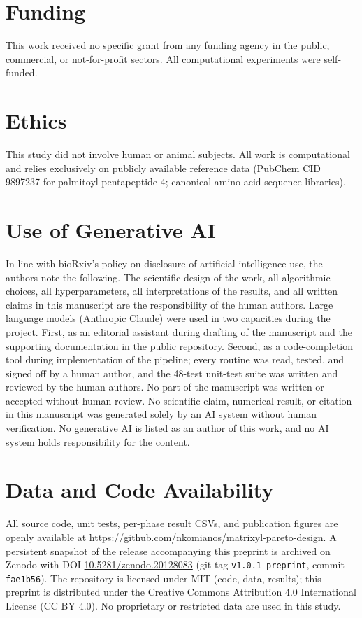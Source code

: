 \documentclass[11pt,letterpaper]{article}
\begin{document}
\section*{Funding}

This work received no specific grant from any funding agency in the public, commercial, or not-for-profit sectors. All computational experiments were self-funded.

\section*{Ethics}

This study did not involve human or animal subjects. All work is computational and relies exclusively on publicly available reference data (PubChem CID 9897237 for palmitoyl pentapeptide-4; canonical amino-acid sequence libraries).

\section*{Use of Generative AI}

In line with bioRxiv's policy on disclosure of artificial intelligence use, the authors note the following. The scientific design of the work, all algorithmic choices, all hyperparameters, all interpretations of the results, and all written claims in this manuscript are the responsibility of the human authors. Large language models (Anthropic Claude) were used in two capacities during the project. First, as an editorial assistant during drafting of the manuscript and the supporting documentation in the public repository. Second, as a code-completion tool during implementation of the pipeline; every routine was read, tested, and signed off by a human author, and the 48-test unit-test suite was written and reviewed by the human authors. No part of the manuscript was written or accepted without human review. No scientific claim, numerical result, or citation in this manuscript was generated solely by an AI system without human verification. No generative AI is listed as an author of this work, and no AI system holds responsibility for the content.

\section*{Data and Code Availability}

All source code, unit tests, per-phase result CSVs, and publication figures are openly available at \url{https://github.com/nkomianos/matrixyl-pareto-design}. A persistent snapshot of the release accompanying this preprint is archived on Zenodo with DOI \href{https://doi.org/10.5281/zenodo.20128083}{10.5281/zenodo.20128083} (git tag \texttt{v1.0.1-preprint}, commit \texttt{fae1b56}). The repository is licensed under MIT (code, data, results); this preprint is distributed under the Creative Commons Attribution 4.0 International License (CC BY 4.0). No proprietary or restricted data are used in this study.
\end{document}
